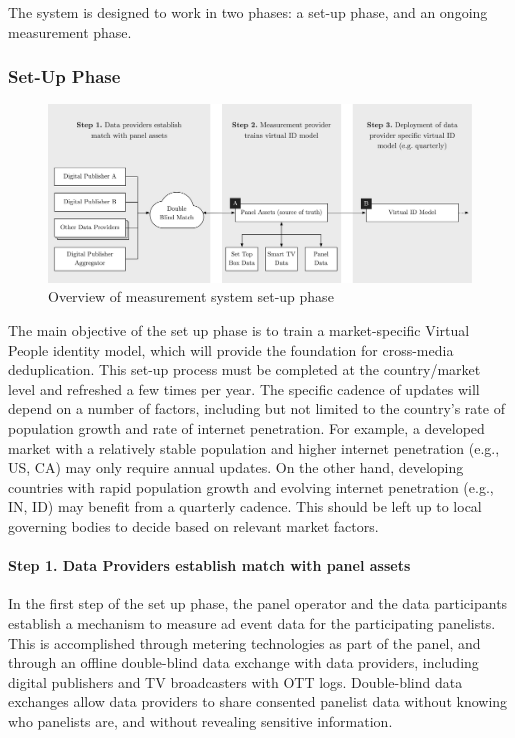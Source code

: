 \documentclass[]{article}
\let\oldparagraph\paragraph
\renewcommand{\paragraph}[1]{\oldparagraph{#1}\mbox{}}
\begin{document}
The system is designed to work in two phases: a set-up phase, and an ongoing measurement phase.
 \pagebreak

\subsubsection{Set-Up Phase}


\begin{figure}
\caption{Overview of measurement system set-up phase}
\vspace*{0.5cm}
\includegraphics[width=\textwidth]{image2.png}
\centering
\end{figure}
\FloatBarrier
\vspace*{0.5cm}

The main objective of the set up phase is to train a market-specific Virtual People identity model, which will provide the foundation for cross-media deduplication. This set-up process must be completed at the
country/market level and refreshed a few times per year. The specific cadence of updates will depend on a number of factors, including but not limited to the country's rate of population growth and rate of internet
penetration. For example, a developed market with a relatively stable population and higher internet penetration (e.g., US, CA) may only require annual updates. On the other hand, developing countries with
rapid population growth and evolving internet penetration (e.g., IN, ID) may benefit from a quarterly cadence. This should be left up to local governing bodies to decide based on relevant market factors.


\paragraph{Step 1. Data Providers establish match with panel assets}

In the first step of the set up phase, the panel operator and the data participants establish a mechanism to measure ad event data for the participating panelists. This is accomplished through metering technologies as part of the panel, and through an offline double-blind data exchange with data providers, including digital publishers and TV broadcasters with OTT logs. Double-blind data exchanges allow data providers to share consented panelist data without knowing who panelists are, and without revealing sensitive information.
\end{document}
